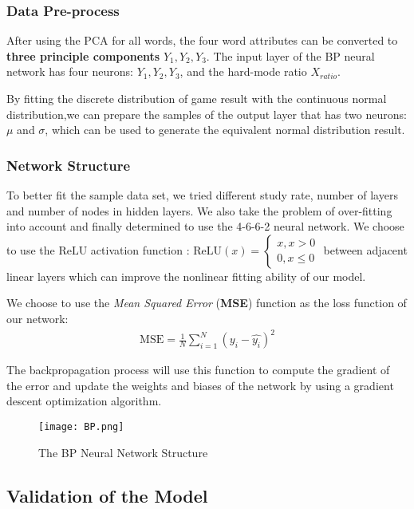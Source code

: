 \subsubsection{Data Pre-process}

After using the PCA for all words, the four word attributes can be converted to \textbf{three principle components} $Y_1, Y_2, Y_3$. The input layer of the BP neural network has four neurons: $Y_1, Y_2, Y_3$, and the hard-mode ratio $X_{ratio}$.

By fitting the discrete distribution of game result with the continuous normal distribution,we can prepare the samples of the output layer that has two neurons: $\mu$ and $\sigma$, which can be used to generate the equivalent normal distribution result.

\subsubsection{Network Structure}

To better fit the sample data set, we tried different study rate, number of layers and number of nodes in hidden layers. We also take the problem of over-fitting into account and finally determined to use the 4-6-6-2 neural network. We choose to use the $\mathrm{ReLU}$ activation function : $\mathrm{ReLU}(x) = \begin{cases}
    x,  x> 0\\
    0, x\leq 0
\end{cases}$ between adjacent linear layers which can improve the nonlinear fitting ability of our model.

We choose to use the \emph{Mean Squared Error} (\textbf{MSE}) function as the loss function of our network:
\begin{align}
    \mathrm{MSE} = \frac{1}{N}\sum_{i=1}^N(y_i - \hat{y_i})^2
\end{align}

The backpropagation process will use this function to compute the gradient of the error and update the weights and biases of the network by using a gradient descent optimization algorithm.

\begin{figure}[H]
    \centering
    \texttt{[image: BP.png]}
    \caption{The BP Neural Network Structure}
\end{figure}

\subsection{Validation of the Model}

